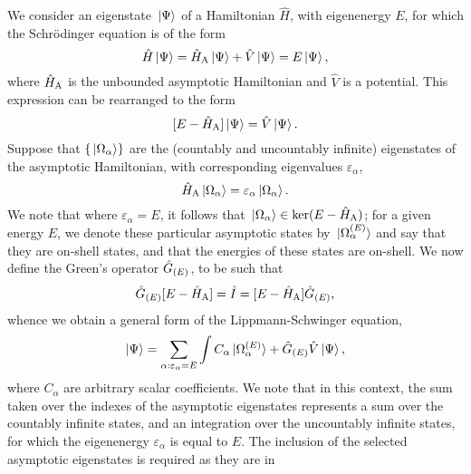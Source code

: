 \documentclass[draft]{article}
\begin{document}
We consider an eigenstate $\ket*{\Psi}$ of a Hamiltonian $\hat{H}$, with
eigenenergy $E$, for which the Schr\"odinger equation is of the form
\begin{equation}
  \label{eq:schrodinger}
  \hat{H}
  \ket{\Psi}
  =
  \hat{H}_{\rm{A}}
  \ket{\Psi}
  +
  \hat{V}
  \ket{\Psi}
  =
  E
  \ket{\Psi}
  ,
\end{equation}
where $\hat{H}_{\rm{A}}$ is the unbounded asymptotic Hamiltonian and $\hat{V}$
is a potential.
This expression can be rearranged to the form
\begin{equation}
  \label{eq:schrodinger-2}
  [
    E
    -
    \hat{H}_{\rm{A}}
  ]
  \ket{\Psi}
  =
  \hat{V}
  \ket{\Psi}
  .
\end{equation}
Suppose that $\lbrace\ket*{\Omega_{\alpha}}\rbrace$ are the (countably and
uncountably infinite) eigenstates of the asymptotic Hamiltonian, with
corresponding eigenvalues
$\varepsilon_{\alpha}$,
\begin{equation}
  \label{eq:schrodinger-asymptotic}
  \hat{H}_{\rm{A}}
  \ket{\Omega_{\alpha}}
  =
  \varepsilon_{\alpha}
  \ket{\Omega_{\alpha}}
  .
\end{equation}
We note that where $\varepsilon_{\alpha} = E$, it follows that
$\ket*{\Omega_{\alpha}} \in \ker(E - \hat{H}_{\rm{A}})$; for a given energy
$E$, we denote these particular asymptotic states by
$\ket*{\Omega_{\alpha}^{(E)}}$ and say that they are on-shell states, and
that the energies of these states are on-shell.
We now define the Green's operator $\hat{G}_{(E)}$, to be such that
\begin{equation}
  \label{eq:greens-operator}
  \hat{G}_{(E)}
  [
    E
    -
    \hat{H}_{\rm{A}}
  ]
  =
  \hat{I}
  =
  [
    E
    -
    \hat{H}_{\rm{A}}
  ]
  \hat{G}_{(E)}
  ,
\end{equation}
whence we obtain a general form of the Lippmann-Schwinger equation,
\begin{equation}
  \label{eq:ls}
  \ket{\Psi}
  =
  \sum_{\alpha : \varepsilon_{\alpha} = E}\int
  C_{\alpha}
  \ket*{\Omega_{\alpha}^{(E)}}
  +
  \hat{G}_{(E)}
  \hat{V}
  \ket{\Psi}
  ,
\end{equation}
where $C_{\alpha}$ are arbitrary scalar coefficients.
We note that in this context, the sum taken over the indexes of the asymptotic
eigenstates represents a sum over the countably infinite states, and an
integration over the uncountably infinite states, for which the eigenenergy
$\varepsilon_{\alpha}$ is equal to $E$.
The inclusion of the selected asymptotic eigenstates is required as they are in
\end{document}
